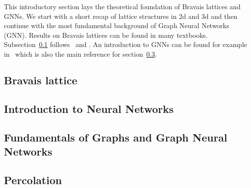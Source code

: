 This introductory section lays the theoretical foundation of Bravais lattices and GNNs. 
We start with a short recap of lattice structures in 2d and 3d and then continue with 
the most fundamental background of Graph Neural Networks (GNN). 
Results on Bravais lattices can be found in many textbooks. Subsection~\ref{sec:brav_latt} follows~\cite{Schwarzenberger} and \cite{symGroupsApplications}.
An introduction to GNNs can be found for example in~\cite{IntroMessagePassing} which is also the main reference for section~\ref{sec:fund_gnns}.

\subsection{Bravais lattice}
\label{sec:brav_latt}


\subsection{Introduction to Neural Networks}
\label{sec:intro_nn}


\subsection{Fundamentals of Graphs and Graph Neural Networks}
\label{sec:fund_gnns}


\subsection{Percolation}
\label{sec:intro_percolation}
